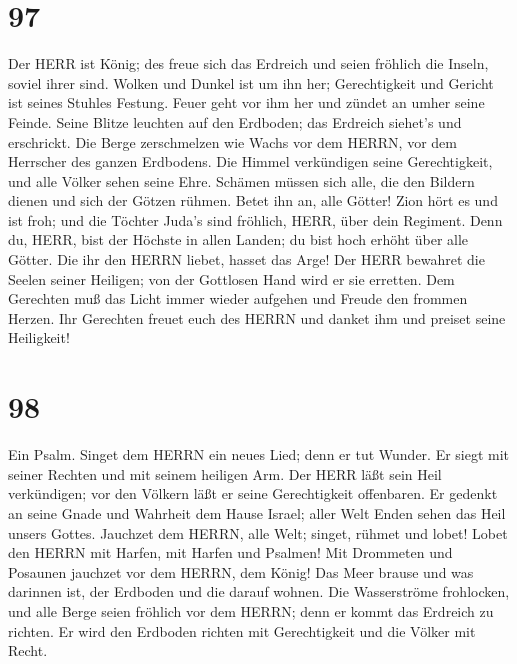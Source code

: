 \hypertarget{section-96}{%
\section{97}\label{section-96}}

 Der HERR ist König; des freue sich das Erdreich und seien
fröhlich die Inseln, soviel ihrer sind.  Wolken und Dunkel
ist um ihn her; Gerechtigkeit und Gericht ist seines Stuhles Festung.
 Feuer geht vor ihm her und zündet an umher seine Feinde.
 Seine Blitze leuchten auf den Erdboden; das Erdreich
siehet's und erschrickt.  Die Berge zerschmelzen wie Wachs
vor dem HERRN, vor dem Herrscher des ganzen Erdbodens.  Die
Himmel verkündigen seine Gerechtigkeit, und alle Völker sehen seine
Ehre.  Schämen müssen sich alle, die den Bildern dienen und
sich der Götzen rühmen. Betet ihn an, alle Götter!  Zion
hört es und ist froh; und die Töchter Juda's sind fröhlich, HERR, über
dein Regiment.  Denn du, HERR, bist der Höchste in allen
Landen; du bist hoch erhöht über alle Götter.  Die ihr den
HERRN liebet, hasset das Arge! Der HERR bewahret die Seelen seiner
Heiligen; von der Gottlosen Hand wird er sie erretten.  Dem
Gerechten muß das Licht immer wieder aufgehen und Freude den frommen
Herzen.  Ihr Gerechten freuet euch des HERRN und danket ihm
und preiset seine Heiligkeit!

\hypertarget{section-97}{%
\section{98}\label{section-97}}

 Ein Psalm. Singet dem HERRN ein neues Lied; denn er tut
Wunder. Er siegt mit seiner Rechten und mit seinem heiligen Arm.
 Der HERR läßt sein Heil verkündigen; vor den Völkern läßt
er seine Gerechtigkeit offenbaren.  Er gedenkt an seine
Gnade und Wahrheit dem Hause Israel; aller Welt Enden sehen das Heil
unsers Gottes.  Jauchzet dem HERRN, alle Welt; singet,
rühmet und lobet!  Lobet den HERRN mit Harfen, mit Harfen
und Psalmen!  Mit Drommeten und Posaunen jauchzet vor dem
HERRN, dem König!  Das Meer brause und was darinnen ist, der
Erdboden und die darauf wohnen.  Die Wasserströme
frohlocken, und alle Berge seien fröhlich  vor dem HERRN;
denn er kommt das Erdreich zu richten. Er wird den Erdboden richten mit
Gerechtigkeit und die Völker mit Recht.

